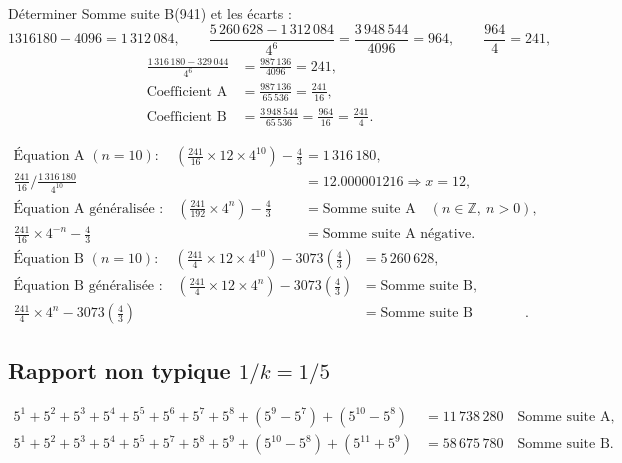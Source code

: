 \documentclass[11pt,a4paper]{article}
\begin{document}
\begin{boitenote}
\begin{boitenote}[Inspiration]
\begin{boitenote}
Déterminer Somme suite B(941) et les écarts :
\[
1316180 - 4096 = 1\,312\,084,
\qquad
\frac{5\,260\,628 - 1\,312\,084}{4^{6}} = \frac{3\,948\,544}{4096} = 964,
\qquad
\frac{964}{4} = 241,
\]
\begin{align*}
\frac{1\,316\,180 - 329\,044}{4^{6}}
&= \frac{987\,136}{4096} = 241,\\
\text{Coefficient A} &= \frac{987\,136}{65\,536} = \frac{241}{16},\\
\text{Coefficient B} &= \frac{3\,948\,544}{65\,536}
= \frac{964}{16} = \frac{241}{4}.
\end{align*}

\vspace{0.3cm}
\begin{boiteformule}
\begin{align*}
\text{Équation A }(n=10):\quad
\left(\frac{241}{16}\times12\times4^{10}\right)-\frac{4}{3}
&=1\,316\,180,\\
\frac{241}{16}\Big/\frac{1\,316\,180}{4^{10}}
&=12.000001216\Rightarrow x=12,\\
\text{Équation A généralisée :}\quad
\left(\frac{241}{192}\times4^{n}\right)-\frac{4}{3}
&=\text{Somme suite A}\quad(n\in\mathbb{Z},\ n>0),\\
\frac{241}{16}\times4^{-n}-\frac{4}{3}
&=\text{Somme suite A négative}.
\end{align*}
\begin{align*}
\text{Équation B }(n=10):\quad
\left(\frac{241}{4}\times12\times4^{10}\right)-3073\left(\frac{4}{3}\right)
&=5\,260\,628,\\
\text{Équation B généralisée :}\quad
\left(\frac{241}{4}\times12\times4^{n}\right)-3073\left(\frac{4}{3}\right)
&=\text{Somme suite B},\\
\frac{241}{4}\times4^{n}-3073\left(\frac{4}{3}\right)
&=\text{Somme suite B négative}.
\end{align*}
\end{boiteformule}

\subsection{Rapport non typique $1/k = 1/5$}

\vspace{0.3cm}
\begin{boiteformule}[Sommes des suites A et B --- rapport $1/5$, $n = 10$]
\begin{align*}
5^{1}+5^{2}+5^{3}+5^{4}+5^{5}+5^{6}+5^{7}+5^{8}+(5^{9}-5^{7})+(5^{10}-5^{8})
  &= 11\,738\,280 \quad \text{Somme suite A},\\
5^{1}+5^{2}+5^{3}+5^{4}+5^{5}+5^{7}+5^{8}+5^{9}+(5^{10}-5^{8})+(5^{11}+5^{9})
  &= 58\,675\,780 \quad \text{Somme suite B}.
\end{align*}
\end{boiteformule}


\end{boitenote}
\end{boitenote}
\end{boitenote}
\end{document}
